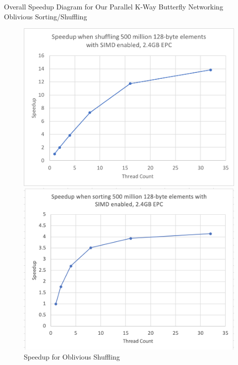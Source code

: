\documentclass[final,hyperref={pdfpagelabels=false}]{beamer}
\begin{document}
\begin{frame}
\begin{columns}[t]
\begin{column}{.30\linewidth}
\begin{figure}[h]
    \end{figure}
    \vspace{50}
    \begin{block}{Overall Speedup Diagram for Our Parallel K-Way Butterfly Networking Oblivious Sorting/Shuffling}
    \end{block}
    \begin{figure}[h]
        \centering
        \begin{minipage}{0.48\linewidth}
            \includegraphics[width=\linewidth]{assets/speedup_shuffle.png}
            \caption{Speedup for Oblivious Shuffling}
        \end{minipage}
        \hfill
        \begin{minipage}{0.48\linewidth}
            \includegraphics[width=\linewidth]{assets/speedup_sort.png}

\end{minipage}
\end{figure}
\end{column}
\end{columns}
\end{frame}
\end{document}
